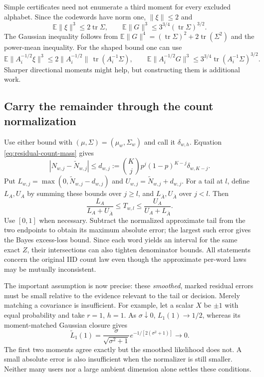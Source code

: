 \documentclass[10pt,a4paper]{article}
\newcommand{\E}{\mathbb E}
\begin{document}
Simple certificates need not enumerate a third moment for every excluded alphabet. Since the codewords
have norm one, $\|\xi\|\leq2$ and
\[
 \E\|\xi\|^3\leq2\operatorname{tr}\Sigma,\qquad
 \E\|G\|^3\leq3^{3/4}(\operatorname{tr}\Sigma)^{3/2}.
\]
The Gaussian inequality follows from
$\E\|G\|^4=(\operatorname{tr}\Sigma)^2+2\operatorname{tr}(\Sigma^2)$ and the power-mean inequality.
For the shaped bound one can use
\[
 \E\|A_i^{-1/2}\xi\|^3
 \leq 2\|A_i^{-1/2}\|\,\operatorname{tr}(A_i^{-1}\Sigma),\qquad
 \E\|A_i^{-1/2}G\|^3
 \leq3^{3/4}\operatorname{tr}(A_i^{-1}\Sigma)^{3/2}.
\]
Sharper directional moments might help, but constructing them is additional work.

\subsection{Carry the remainder through the count normalization}
Use either bound with $(\mu,\Sigma)=(\mu_w,\Sigma_w)$ and call it $\delta_{w,h}$.
Equation \eqref{eq:residual-count-mass} gives
\[
 |N_{w,j}-\widetilde N_{w,j}|
 \leq d_{w,j}:=\binom Kj p^j(1-p)^{K-j}\delta_{w,K-j}.
\]
Put $L_{w,j}=\max(0,\widetilde N_{w,j}-d_{w,j})$ and
$U_{w,j}=\widetilde N_{w,j}+d_{w,j}$. For a tail at $l$, define $L_A,U_A$ by summing these bounds over
$j\geq l$, and $L_{\bar A},U_{\bar A}$ over $j<l$. Then
\begin{equation}
 \frac{L_A}{L_A+U_{\bar A}}\leq T_{w,l}
 \leq\frac{U_A}{U_A+L_{\bar A}}.
 \label{eq:gaussian-count-envelopes}
\end{equation}
Use $[0,1]$ when necessary. Subtract the normalized approximate tail from the two endpoints to obtain its
maximum absolute error; the largest such error gives the Bayes excess-loss bound. Since each word yields
an interval for the same exact $Z$, their intersections can also tighten denominator bounds.
All statements concern the original IID count law even though the approximate per-word laws may be mutually
inconsistent.

The important assumption is now precise: these \emph{smoothed}, marked residual errors must be small
relative to the evidence relevant to the tail or decision. Merely matching a covariance is insufficient.
For example, let a scalar $X$ be $\pm1$ with equal probability and take $r=1$, $h=1$.
As $\sigma\downarrow0$, $L_1(1)\to1/2$, whereas its moment-matched Gaussian closure gives
\[
 \widetilde L_1(1)=\frac{\sigma}{\sqrt{\sigma^2+1}}
             e^{-1/[2(\sigma^2+1)]}\longrightarrow0.
\]
The first two moments agree exactly but the smoothed likelihood does not. A small absolute error is also
insufficient when the normalizer is still smaller. Neither many users nor a large ambient dimension alone
settles these conditions.
\end{document}
